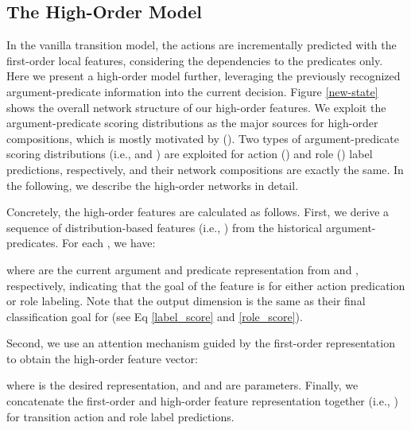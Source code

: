 \documentclass[letterpaper]{article} \usepackage{aaai21}  \usepackage{times}  \usepackage{helvet} \usepackage{courier}  \usepackage[hyphens]{url}  \usepackage{graphicx} \urlstyle{rm} \def\UrlFont{\rm}  \usepackage{natbib}  \usepackage{caption}
\begin{document}
\begin{CJK}{UTF8}{gbsn}
\subsection{The High-Order Model}


In the vanilla transition model, the actions are incrementally predicted with the first-order local features,
considering the dependencies to the predicates only.
Here we present a high-order model further, leveraging the previously recognized argument-predicate information into the current decision.
Figure \ref{new-state} shows the overall network structure of our high-order features.
We exploit the argument-predicate scoring distributions as the major sources for high-order compositions,
which is mostly motivated by \citeauthor{lyu-etal-2019-semantic} (\citeyear{lyu-etal-2019-semantic}).
Two types of argument-predicate scoring distributions (i.e.,  and ) are exploited for action () and role () label predictions, respectively,
and their network compositions are exactly the same.
In the following, we describe the high-order networks in detail.






Concretely, the high-order features are calculated as follows.
First, we derive a sequence of distribution-based features (i.e.,  ) from the historical argument-predicates.
For each , we have:

where  are the current argument and predicate representation from  and , respectively,
 indicating that the goal of the feature is for either action predication or role labeling.
Note that the output dimension is the same as their final classification goal for  (see Eq \ref{label_score} and \ref{role_score}).

Second, we use an attention mechanism guided by the first-order representation  to obtain the high-order feature vector:

where  is the desired representation, and  and   are parameters.
Finally, we concatenate the first-order and high-order feature representation together (i.e., ) for transition action and role label predictions.  






\end{CJK}
\end{document}

